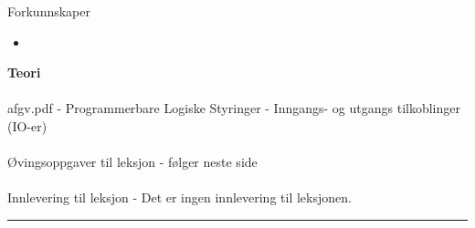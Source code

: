	Forkunnskaper

	\begin{itemize}[noitemsep]
		\item 

	\end{itemize}
\textbf{Teori}\\\\
afgv.pdf - Programmerbare Logiske Styringer - Inngangs- og utgangs tilkoblinger (IO-er)\\\\
Øvingsoppgaver til leksjon - følger neste side\\\\
Innlevering til leksjon - Det er ingen innlevering til leksjonen. 
\bigskip 
\hrule
\vfil \eject
